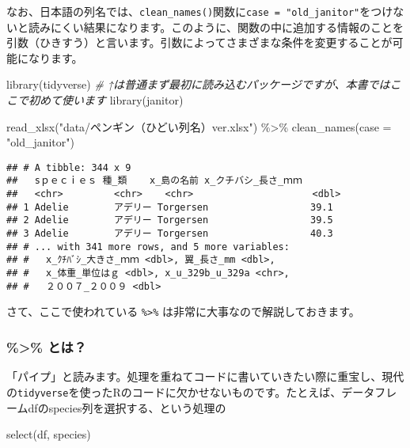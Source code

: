 \documentclass[
  xelatex,ja=standard, b5paper]{bxjsbook}
\newenvironment{Shaded}{\begin{snugshade}}{\end{snugshade}}
\newcommand{\AttributeTok}[1]{\textcolor[rgb]{0.77,0.63,0.00}{#1}}
\newcommand{\CommentTok}[1]{\textcolor[rgb]{0.56,0.35,0.01}{\textit{#1}}}
\newcommand{\FunctionTok}[1]{\textcolor[rgb]{0.00,0.00,0.00}{#1}}
\newcommand{\NormalTok}[1]{#1}
\newcommand{\SpecialCharTok}[1]{\textcolor[rgb]{0.00,0.00,0.00}{#1}}
\newcommand{\StringTok}[1]{\textcolor[rgb]{0.31,0.60,0.02}{#1}}
\begin{document}
なお、日本語の列名では、\texttt{clean\_names()}関数に\texttt{case\ =\ "old\_janitor"}をつけないと読みにくい結果になります。このように、関数の中に追加する情報のことを引数（ひきすう）と言います。引数によってさまざまな条件を変更することが可能になります。

\begin{Shaded}
\begin{Highlighting}[]
\FunctionTok{library}\NormalTok{(tidyverse)}
    \CommentTok{\# ↑は普通まず最初に読み込むパッケージですが、本書ではここで初めて使います}
\FunctionTok{library}\NormalTok{(janitor)}

\FunctionTok{read\_xlsx}\NormalTok{(}\StringTok{"data/ペンギン（ひどい列名）ver.xlsx"}\NormalTok{) }\SpecialCharTok{\%\textgreater{}\%} 
  \FunctionTok{clean\_names}\NormalTok{(}\AttributeTok{case =} \StringTok{"old\_janitor"}\NormalTok{)}
\end{Highlighting}
\end{Shaded}

\begin{verbatim}
## # A tibble: 344 x 9
##   sｐｅｃｉｅｓ 種_類    x_島の名前 x_クチバシ_長さ_ｍｍ
##   <chr>         <chr>    <chr>                     <dbl>
## 1 Adelie        アデリー Torgersen                  39.1
## 2 Adelie        アデリー Torgersen                  39.5
## 3 Adelie        アデリー Torgersen                  40.3
## # ... with 341 more rows, and 5 more variables:
## #   x_ｸﾁﾊﾞｼ_大きさ_ｍｍ <dbl>, 翼_長さ_mm <dbl>,
## #   x_体重_単位はｇ <dbl>, x_u_329b_u_329a <chr>,
## #   ２００７_２００９ <dbl>
\end{verbatim}

さて、ここで使われている \texttt{\%\textgreater{}\%} は非常に大事なので解説しておきます。

\hypertarget{pipe}{%
\subsubsection{\%\textgreater\% とは？}\label{pipe}}

「パイプ」と読みます。処理を重ねてコードに書いていきたい際に重宝し、現代の\texttt{tidyverse}を使ったRのコードに欠かせないものです。たとえば、データフレームdfのspecies列を選択する、という処理の

\begin{Shaded}
\begin{Highlighting}[]
\FunctionTok{select}\NormalTok{(df, species)}
\end{Highlighting}
\end{Shaded}
\end{document}
